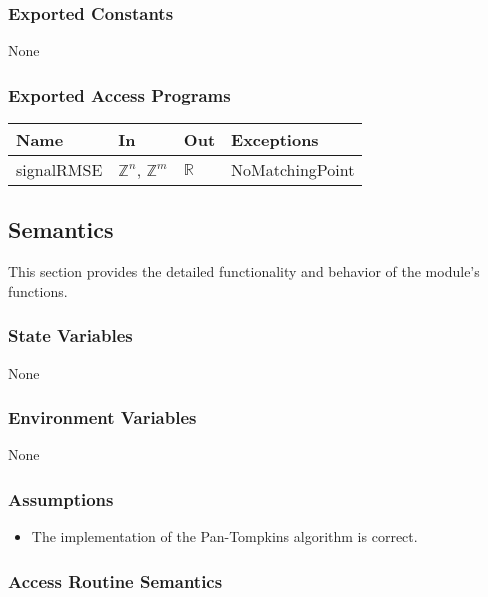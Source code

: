 \documentclass[12pt, titlepage]{article}
\begin{document}
\subsubsection{Exported Constants}

None

\subsubsection{Exported Access Programs}

\begin{center}
\begin{tabular}{p{2cm} p{4cm} p{4cm} p{5cm}}
\hline
\textbf{Name} & \textbf{In} & \textbf{Out} & \textbf{Exceptions} \\
\hline
signalRMSE & $\mathbb{Z}^n$, $\mathbb{Z}^m$ & $\mathbb{R}$ & NoMatchingPoint \\
\hline
\end{tabular}
\end{center}

\subsection{Semantics}

This section provides the detailed functionality and behavior of the module’s
functions.

\subsubsection{State Variables}

None

\subsubsection{Environment Variables}

None

\subsubsection{Assumptions}

\begin{itemize}
\item The implementation of the Pan-Tompkins algorithm is correct.
\end{itemize}

\subsubsection{Access Routine Semantics}
\end{document}
